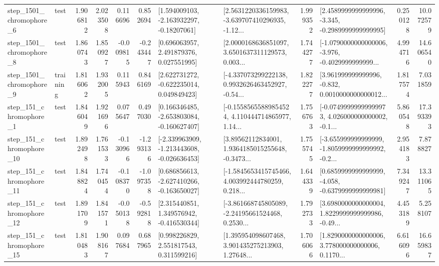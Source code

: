 \begin{tabular}{llrrrrllrlrr}
  step\_1501\_chromophore\_6 &      test &      1.906812 &    2.023508 &      0.116696 &  0.852694 &    [1.594009103, -2.163932297, -0.18207061] &  [2.5631220336159983, -3.639707410296935, -1.12... &       1.999352 &  [2.4589999999999996, -3.345, -0.2989999999999995] &            0.250128 &         10.072579 \\
  step\_1501\_chromophore\_8 &      test &      1.860743 &    1.850927 &     -0.009815 & -0.243447 &     [0.696063957, 2.491879376, 0.027551995] &  [2.0000168636851097, 3.6501637311129573, 0.003... &       1.744277 &  [-1.0790000000000006, -3.976, -0.4029999999999... &            4.994716 &         14.606540 \\
  step\_1501\_chromophore\_9 &  training &      1.816062 &    1.932005 &      0.115943 &  0.846169 &    [2.622731272, -0.622235014, 0.049849423] &  [-4.337073299222138, 0.9932626463452927, -0.54... &       1.822277 &  [3.961999999999996, -0.832, 0.0010000000000012... &            1.817574 &          7.031859 \\
   step\_151\_chromophore\_1 &      test &      1.846049 &    1.921696 &      0.075647 &  0.497030 &   [0.166346485, -2.653803084, -0.160627407] &  [-0.15585655889854524, 4.110444714865977, 1.14... &       1.756763 &  [-0.07499999999999973, 4.026000000000002, -0.1... &            5.860548 &         17.393393 \\
  step\_151\_chromophore\_10 &      test &      1.892498 &    1.761533 &     -0.130966 & -1.293136 &  [-2.339963909, -1.213443608, -0.026636453] &  [3.89562112834001, 1.9364185015255648, -0.3473... &       1.755745 &  [-3.655999999999999, -1.8059999999999992, -0.2... &            2.954183 &          7.878827 \\
  step\_151\_chromophore\_11 &      test &      1.848824 &    1.740454 &     -0.108370 & -1.097358 &   [0.686856613, -2.627410266, -0.163650027] &  [-1.5845653415745466, 4.003992444780259, 0.218... &       1.644339 &  [0.6859999999999999, -4.058, -0.6379999999999981] &            7.349247 &         13.311065 \\
  step\_151\_chromophore\_12 &      test &      1.891709 &    1.841571 &     -0.050138 & -0.592818 &    [2.315440851, 1.349576942, -0.416530344] &  [-3.861668745805089, -2.24195661524468, 0.2530... &       1.792733 &  [3.6980000000000004, 1.8229999999999986, -0.49... &            4.453189 &          5.258107 \\
  step\_151\_chromophore\_15 &      test &      1.810483 &    1.908167 &      0.097684 &  0.687965 &     [0.998226829, 2.551817543, 0.311599216] &  [1.395954098607468, 3.901435275213903, 1.27648... &       1.706066 &  [1.8290000000000006, 3.778000000000006, 0.1170... &            6.616096 &         16.659837 \\

\end{tabular}
